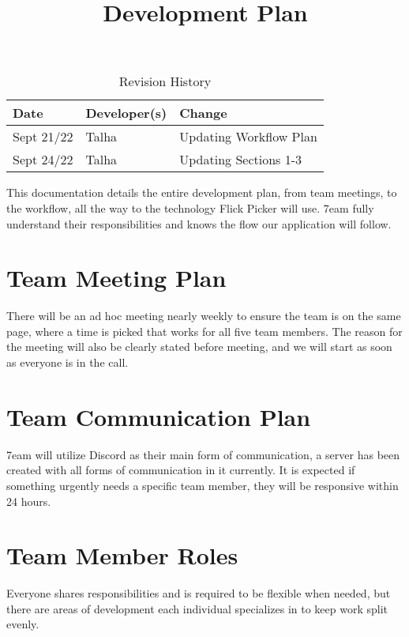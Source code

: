 \documentclass{article}
\title{Development Plan\\\progname}
\author{\authname}
\date{}
\begin{document}
\maketitle

\newpage

\begin{table}[hp]
\caption{Revision History} \label{TblRevisionHistory}
\begin{tabularx}{\textwidth}{llX}
\toprule
\textbf{Date} & \textbf{Developer(s)} & \textbf{Change}\\
\midrule
Sept 21/22 & Talha & Updating Workflow Plan\\
Sept 24/22 & Talha & Updating Sections 1-3\\
\bottomrule
\end{tabularx}
\end{table}

\newpage

\tableofcontents

\newpage

This documentation details the entire development plan, from team meetings, to the workflow, all the way to the technology Flick Picker will use. 7eam fully understand their responsibilities and knows the flow our application will follow. 

\section{Team Meeting Plan}
There will be an ad hoc meeting nearly weekly to ensure the team is on the same page, where a time is picked that works for all five team members. The reason for the meeting will also be clearly stated before meeting, and we will start as soon as everyone is in the call.

\section{Team Communication Plan}
7eam will utilize Discord as their main form of communication, a server has been created with all forms of communication in it currently. It is expected if something urgently needs a specific team member, they will be responsive within 24 hours.

\section{Team Member Roles}
Everyone shares responsibilities and is required to be flexible when needed, but there are areas of development each individual specializes in to keep work split evenly.
\end{document}
